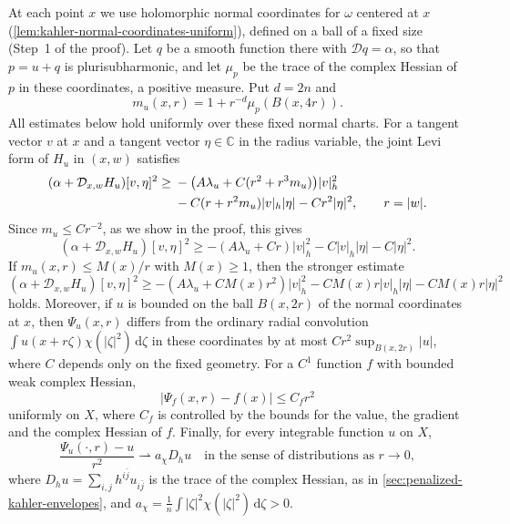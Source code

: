 \begin{lemma}
At each point $x$ we use holomorphic normal coordinates for $\omega$ centered at $x$ (\cref{lem:kahler-normal-coordinates-uniform}), defined on a ball of a fixed size (Step~1 of the proof). Let $q$ be a smooth function there with $\mathcal Dq=\alpha$, so that $p=u+q$ is plurisubharmonic, and let $\mu_p$ be the trace of the complex Hessian of $p$ in these coordinates, a positive measure. Put $d=2n$ and
\[
 m_u(x,r)=1+r^{-d}\mu_p(B(x,4r)).
\]
All estimates below hold uniformly over these fixed normal charts. For a tangent vector $v$ at $x$ and a tangent vector $\eta\in\mathbb C$ in the radius variable, the joint Levi form of $H_u$ in $(x,w)$ satisfies
\begin{align}\label{eq:chern-joint-mass-estimate}
 (\alpha+\mathcal D_{x,w}H_u)[v,\eta]^2
 \geq{}&-\bigl(A\lambda_u+C(r^2+r^3m_u)\bigr)|v|_h^2\notag\\
       &-C(r+r^2m_u)|v|_h|\eta|-Cr^2|\eta|^2,
       \qquad r=|w|.
\end{align}
Since $m_u\leq Cr^{-2}$, as we show in the proof, this gives
\begin{equation}\label{eq:chern-initial-joint-bound}
 (\alpha+\mathcal D_{x,w}H_u)[v,\eta]^2
 \geq-(A\lambda_u+Cr)|v|_h^2-C|v|_h|\eta|-C|\eta|^2.
\end{equation}
If $m_u(x,r)\leq M(x)/r$ with $M(x)\geq1$, then the stronger estimate
\begin{equation}\label{eq:chern-improved-joint-bound}
 (\alpha+\mathcal D_{x,w}H_u)[v,\eta]^2
 \geq-(A\lambda_u+CM(x)r^2)|v|_h^2
                    -CM(x)r|v|_h|\eta|-CM(x)r|\eta|^2
\end{equation}
holds. Moreover, if $u$ is bounded on the ball $B(x,2r)$ of the normal coordinates at $x$, then $\Psi_u(x,r)$ differs from the ordinary radial convolution $\int u(x+r\zeta)\chi(|\zeta|^2)\,\mathrm d\zeta$ in these coordinates by at most $Cr^2\sup_{B(x,2r)}|u|$, where $C$ depends only on the fixed geometry. For a $C^1$ function $f$ with bounded weak complex Hessian,
\begin{equation}\label{eq:chern-regular-obstacle-error}
 |\Psi_f(x,r)-f(x)|\leq C_f r^2
\end{equation}
uniformly on $X$, where $C_f$ is controlled by the bounds for the value, the gradient and the complex Hessian of $f$. Finally, for every integrable function $u$ on $X$,
\begin{equation}\label{eq:chern-smoothing-generator}
 \frac{\Psi_u(\cdot,r)-u}{r^2}\rightharpoonup a_\chi D_hu
 \quad\text{in the sense of distributions as }r\to0,
\end{equation}
where $D_hu=\sum_{i,j}h^{i\bar j}u_{i\bar j}$ is the trace of the complex Hessian, as in \cref{sec:penalized-kahler-envelopes}, and $a_\chi=\frac1n\int|\zeta|^2\chi(|\zeta|^2)\,\mathrm d\zeta>0$.
\end{lemma}
